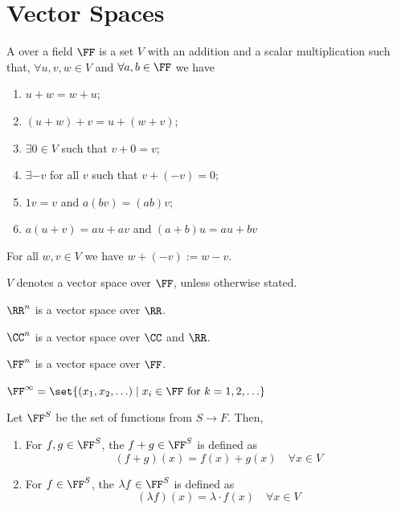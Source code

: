 \section{Vector Spaces}
\begin{definition}
    A  over a field $\FF$ is a set $V$ with an addition and a scalar multiplication such that, $\forall u,v,w \in V$
    and $\forall a,b \in \FF$ we have
    \begin{enumerate}
        \item $u+w=w+u$;
        \item $(u+w)+v=u+(w+v)$;
        \item $\exists 0 \in V$ such that $v+0=v$;
        \item $\exists -v$ for all $v$ such that $v+(-v)=0$;
        \item $1v=v$ and $a(bv)=(ab)v$;
        \item $a(u+v)=au+av$ and $(a+b)u=au+bv$
    \end{enumerate}
\end{definition}

\begin{notation}
    For all $w,v \in V$ we have $w+(-v) := w-v$.
\end{notation}

\begin{notation}
    $V$ denotes a vector space over $\FF$, unless otherwise stated.
\end{notation}

\begin{example}
$\RR^n$ is a vector space over $\RR$. 
\end{example}

\begin{example}
$\CC^n$ is a vector space over $\CC$ and $\RR$.
\end{example}
    
\begin{example}
$\FF^n$ is a vector space over $\FF$.
\end{example}

\begin{notation}
    $\FF^{\infty} = \set{(x_1,x_2,\ldots) \mid x_i \in \FF \text{ for } k = 1,2,\ldots}$
\end{notation}

\begin{notation}
    Let $\FF^S$ be the set of functions from $S \to F$. Then,
    \begin{enumerate}
        \item For $f,g \in \FF^S$, the  $f+g \in \FF^S$ is defined as 
                    \[ (f+g)(x) = f(x)+g(x) \quad \forall x \in V \]
        \item For $f \in \FF^S$, the  $\lambda f \in \FF^S$ is defined as
                    \[ (\lambda f)(x) = \lambda \cdot f(x) \quad \forall x \in V \]
    \end{enumerate}
\end{notation}

